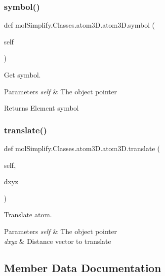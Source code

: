 \subsubsection{\texorpdfstring{symbol()}{symbol()}}
{\footnotesize\ttfamily def mol\+Simplify.\+Classes.\+atom3\+D.\+atom3\+D.\+symbol (\begin{DoxyParamCaption}\item[{}]{self }\end{DoxyParamCaption})}



Get symbol. 


\begin{DoxyParams}{Parameters}
{\em self} & The object pointer \\
\hline
\end{DoxyParams}
\begin{DoxyReturn}{Returns}
Element symbol 
\end{DoxyReturn}
\mbox{\label{classmolSimplify_1_1Classes_1_1atom3D_1_1atom3D_a3ea82ed2cf89b616bae2088e4052a2c3}} 
\subsubsection{\texorpdfstring{translate()}{translate()}}
{\footnotesize\ttfamily def mol\+Simplify.\+Classes.\+atom3\+D.\+atom3\+D.\+translate (\begin{DoxyParamCaption}\item[{}]{self,  }\item[{}]{dxyz }\end{DoxyParamCaption})}



Translate atom. 


\begin{DoxyParams}{Parameters}
{\em self} & The object pointer \\
\hline
{\em dxyz} & Distance vector to translate \\
\hline
\end{DoxyParams}


\subsection{Member Data Documentation}
\mbox{\label{classmolSimplify_1_1Classes_1_1atom3D_1_1atom3D_a974de7acd7e305b90c376ca5199b37d6}} 
